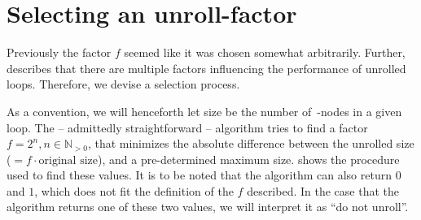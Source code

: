 






\newpage

\section{Selecting an unroll-factor}\label{sec:impl:sel-factor}

Previously the factor $f$ seemed like it was chosen somewhat arbitrarily.
Further,  describes that there are multiple factors influencing the performance of unrolled loops.
Therefore, we devise a selection process.

As a convention, we will henceforth let size be the number of~\libFIRM-nodes in a given loop.
The -- admittedly straightforward -- algorithm tries to find a factor $f = 2^n, n \in \mathbb{N}_{>0}$, that minimizes the absolute difference between the unrolled size ($= f \cdot \text{original size}$), and a pre-determined maximum size.
 shows the procedure used to find these values.
It is to be noted that the algorithm can also return $0$ and $1$, which does not fit the definition of the $f$ described.
In the case that the algorithm returns one of these two values, we will interpret it as ``do not unroll''.

